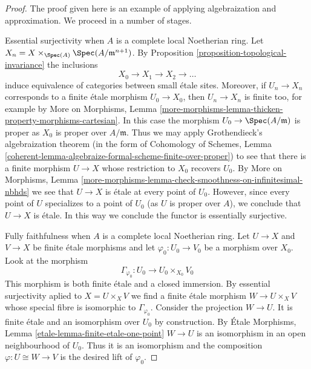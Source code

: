 \begin{proof}
The proof given here is an example of applying algebraization and
approximation. We proceed in a number of stages.

\medskip\noindent
Essential surjectivity when $A$ is a complete local Noetherian ring.
Let $X_n = X \times_{\Spec(A)} \Spec(A/\mathfrak m^{n + 1})$.
By Proposition \ref{proposition-topological-invariance}
the inclusions
$$
X_0 \to X_1 \to X_2 \to \ldots
$$
induce equivalence of categories between small \'etale sites.
Moreover, if $U_n \to X_n$ corresponds to a finite \'etale
morphism $U_0 \to X_0$, then $U_n \to X_n$ is finite too, for example
by More on Morphisms, Lemma
\ref{more-morphisms-lemma-thicken-property-morphisms-cartesian}.
In this case the morphism $U_0 \to \Spec(A/\mathfrak m)$
is proper as $X_0$ is proper over $A/\mathfrak m$. Thus we may apply
Grothendieck's algebraization theorem
(in the form of
Cohomology of Schemes, Lemma
\ref{coherent-lemma-algebraize-formal-scheme-finite-over-proper})
to see that there is a finite morphism $U \to X$ whose restriction
to $X_0$ recovers $U_0$. By More on Morphisms, Lemma
\ref{more-morphisms-lemma-check-smoothness-on-infinitesimal-nbhds}
we see that $U \to X$ is \'etale at every point of $U_0$.
However, since every point of $U$ specializes to a point of $U_0$
(as $U$ is proper over $A$), we conclude that $U \to X$ is \'etale.
In this way we conclude the functor is essentially surjective.

\medskip\noindent
Fully faithfulness when $A$ is a complete local Noetherian ring.
Let $U \to X$ and $V \to X$ be finite \'etale morphisms and
let $\varphi_0 : U_0 \to V_0$ be a morphism over $X_0$. Look at
the morphism
$$
\Gamma_{\varphi_0} : U_0 \longrightarrow U_0 \times_{X_0} V_0
$$
This morphism is both finite \'etale and a closed immersion.
By essential surjectivity aplied to $X = U \times_X V$ we find
a finite \'etale morphism $W \to U \times_X V$ whose special
fibre is isomorphic to $\Gamma_{\varphi_0}$. Consider the projection
$W \to U$. It is finite \'etale and an isomorphism over $U_0$ by
construction. By \'Etale Morphisms, Lemma
\ref{etale-lemma-finite-etale-one-point}
$W \to U$ is an isomorphism in an open neighbourhood of $U_0$.
Thus it is an isomorphism and the composition $\varphi : U \cong W \to V$
is the desired lift of $\varphi_0$.


\end{proof}

